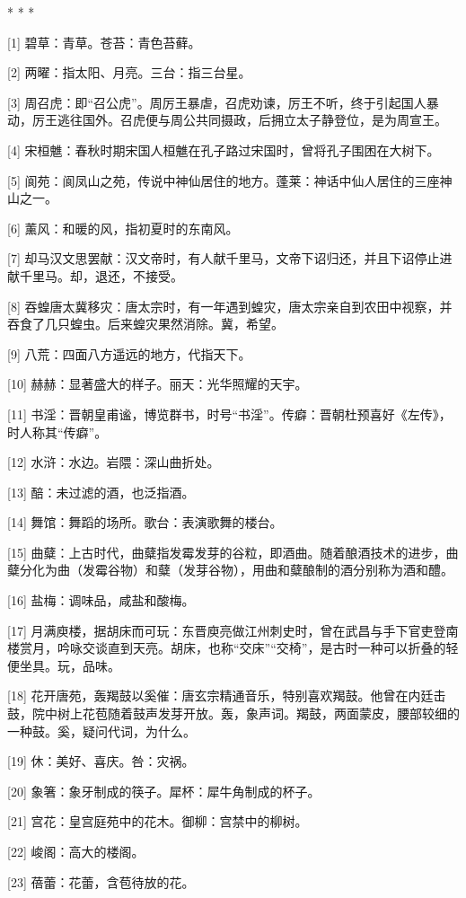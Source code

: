 \documentclass[12pt,UTF8]{ctexbook}
\begin{document}
* * *



[1] 碧草：青草。苍苔：青色苔藓。

[2] 两曜：指太阳、月亮。三台：指三台星。

[3] 周召虎：即“召公虎”。周厉王暴虐，召虎劝谏，厉王不听，终于引起国人暴动，厉王逃往国外。召虎便与周公共同摄政，后拥立太子静登位，是为周宣王。

[4] 宋桓魋：春秋时期宋国人桓魋在孔子路过宋国时，曾将孔子围困在大树下。

[5] 阆苑：阆凤山之苑，传说中神仙居住的地方。蓬莱：神话中仙人居住的三座神山之一。

[6] 薰风：和暖的风，指初夏时的东南风。

[7] 却马汉文思罢献：汉文帝时，有人献千里马，文帝下诏归还，并且下诏停止进献千里马。却，退还，不接受。

[8] 吞蝗唐太冀移灾：唐太宗时，有一年遇到蝗灾，唐太宗亲自到农田中视察，并吞食了几只蝗虫。后来蝗灾果然消除。冀，希望。

[9] 八荒：四面八方遥远的地方，代指天下。

[10] 赫赫：显著盛大的样子。丽天：光华照耀的天宇。

[11] 书淫：晋朝皇甫谧，博览群书，时号“书淫”。传癖：晋朝杜预喜好《左传》，时人称其“传癖”。

[12] 水浒：水边。岩隈：深山曲折处。

[13] 醅：未过滤的酒，也泛指酒。

[14] 舞馆：舞蹈的场所。歌台：表演歌舞的楼台。

[15] 曲糵：上古时代，曲糵指发霉发芽的谷粒，即酒曲。随着酿酒技术的进步，曲糵分化为曲（发霉谷物）和糵（发芽谷物），用曲和糵酿制的酒分别称为酒和醴。

[16] 盐梅：调味品，咸盐和酸梅。

[17] 月满庾楼，据胡床而可玩：东晋庾亮做江州刺史时，曾在武昌与手下官吏登南楼赏月，吟咏交谈直到天亮。胡床，也称“交床”“交椅”，是古时一种可以折叠的轻便坐具。玩，品味。

[18] 花开唐苑，轰羯鼓以奚催：唐玄宗精通音乐，特别喜欢羯鼓。他曾在内廷击鼓，院中树上花苞随着鼓声发芽开放。轰，象声词。羯鼓，两面蒙皮，腰部较细的一种鼓。奚，疑问代词，为什么。

[19] 休：美好、喜庆。咎：灾祸。

[20] 象箸：象牙制成的筷子。犀杯：犀牛角制成的杯子。

[21] 宫花：皇宫庭苑中的花木。御柳：宫禁中的柳树。

[22] 峻阁：高大的楼阁。

[23] 蓓蕾：花蕾，含苞待放的花。
\end{document}
